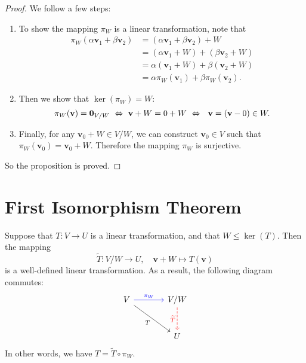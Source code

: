 \begin{proof} We follow a few steps:
\begin{enumerate}
    \item To show the mapping \( \pi_W \) is a linear transformation, note that
    \begin{align*}
    \pi_W(\alpha \mathbf{v}_1 + \beta \mathbf{v}_2) &= (\alpha \mathbf{v}_1 + \beta \mathbf{v}_2) + W \\
    &= (\alpha \mathbf{v}_1 + W) + (\beta \mathbf{v}_2 + W) \\
    &= \alpha (\mathbf{v}_1 + W) + \beta (\mathbf{v}_2 + W) \\
    &= \alpha \pi_W(\mathbf{v}_1) + \beta \pi_W(\mathbf{v}_2).
    \end{align*}
    \item Then we show that \( \ker(\pi_W) = W \):
    \[
    \pi_W(\mathbf{v}) = {\bf 0}_{V/W}\  \Leftrightarrow \ \mathbf{v} + W = 0 + W\ \Leftrightarrow\ \ \mathbf{v} = (\mathbf{v} - 0) \in W.
    \]
    \item Finally, for any \( \mathbf{v}_0 + W \in V/W \), we can construct \( \mathbf{v}_0 \in V \) such that \( \pi_W(\mathbf{v}_0) = \mathbf{v}_0 + W \). Therefore the mapping \( \pi_W \) is surjective.
\end{enumerate}
So the proposition is proved.
\end{proof}

\section{First Isomorphism Theorem}
\begin{proposition}\label{prop: universal-property-quotient}
Suppose that \( T : V \to U \) is a linear transformation, and that \( W \leq \ker(T) \). Then the mapping
\[
\widetilde{T} : V/W \to U, \quad \mathbf{v} + W \mapsto T(\mathbf{v})
\]
is a well-defined linear transformation. As a result, the following diagram commutes:
\[
\begin{tikzcd}[row sep=large, column sep=large]
V \arrow[r, "\pi_W", blue] \arrow[rd, "T"'] & V/W \arrow[d, "\widetilde{T}"', dashed, red] \\
& U
\end{tikzcd}
\]
In other words, we have \( T = \widetilde{T} \circ \pi_W \).
\end{proposition}

